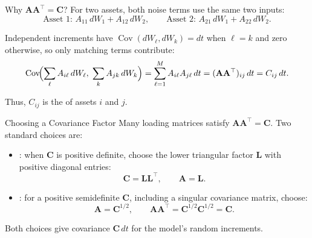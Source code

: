 \documentclass[aspectratio=169,11pt]{beamer}
\newcommand{\Cov}{\operatorname{Cov}}
\newcommand{\bA}{\mathbf{A}}
\newcommand{\bC}{\mathbf{C}}
\begin{document}
\begin{frame}{Why \texorpdfstring{$\bA\bA^{\top}=\bC$}{AAT = C}?}
  For two assets, both noise terms use the same two inputs:
  \[
    \text{Asset 1: }A_{11}\,dW_1+A_{12}\,dW_2,
    \qquad
    \text{Asset 2: }A_{21}\,dW_1+A_{22}\,dW_2.
  \]

  \vspace{0.3em}
  Independent increments have $\Cov(dW_\ell,dW_k)=dt$ when $\ell=k$ and
  zero otherwise, so only matching terms contribute:
  \[
    \Cov\!\Bigl(\sum_{\ell}A_{i\ell}\,dW_\ell,\;\sum_{k}A_{jk}\,dW_k\Bigr)
    =\sum_{\ell=1}^{M}A_{i\ell}A_{j\ell}\,dt
    =(\bA\bA^{\top})_{ij}\,dt
    =C_{ij}\,dt.
  \]

  \vspace{0.3em}
  Thus, $C_{ij}$ is the  of assets $i$ and $j$.
\end{frame}

\begin{frame}{Choosing a Covariance Factor}
  Many loading matrices satisfy $\bA\bA^{\top}=\bC$. Two standard choices are:

  \vspace{0.5em}
  \begin{itemize}\setlength{\itemsep}{0.8em}
    \item {}: when $\bC$ is positive definite,
      choose the lower triangular factor $\mathbf L$ with positive diagonal entries:
      \[
        \bC=\mathbf L\mathbf L^{\top},\qquad \bA=\mathbf L.
      \]
    \item {}: for a positive semidefinite $\bC$,
      including a singular covariance matrix, choose:
      \[
        \bA=\bC^{1/2},\qquad
        \bA\bA^{\top}=\bC^{1/2}\bC^{1/2}=\bC.
      \]
  \end{itemize}

  \vspace{0.3em}
  Both choices give covariance $\bC\,dt$ for the model's random increments.
\end{frame}
\end{document}
